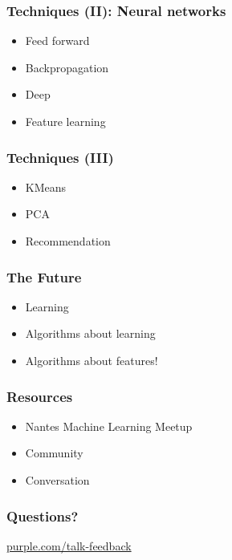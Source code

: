 \begin{frame}
  \frametitle{Techniques (II): Neural networks}

  \begin{itemize}
  \item Feed forward
  \item Backpropagation
  \item Deep
  \item Feature learning
  \end{itemize}
\end{frame}

\begin{frame}
  \frametitle{Techniques (III)}

  \begin{itemize}
  \item KMeans
  \item PCA
  \item Recommendation
  \end{itemize}
\end{frame}

\begin{frame}
  \frametitle{The Future}

  \begin{itemize}
  \item Learning
  \item Algorithms about learning
  \item Algorithms about features!
  \end{itemize}
\end{frame}

\begin{frame}
  \frametitle{Resources}

  \begin{itemize}
  \item Nantes Machine Learning Meetup
  \item Community
  \item Conversation
  \end{itemize}
\end{frame}


\begin{frame}
  \frametitle{Questions?}
  \centerline{\large\url{purple.com/talk-feedback}}
\end{frame}


